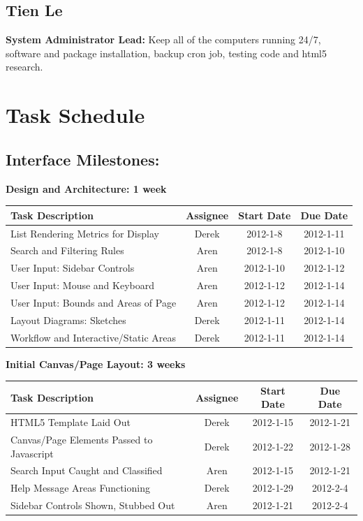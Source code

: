 \documentclass[12pt, letterpaper]{article}
\begin{document}
  \subsection{Tien Le}
  {\bf System Administrator Lead:} Keep all of the computers running 24/7, software and package installation, backup cron job, testing code and html5 research. 

\section{Task Schedule}
	\subsection{Interface Milestones:}

  \begin{center}
		{\bf Design and Architecture: 1 week}
    \begin{tabular}{| p{8.3cm} || c | c | c | }
      \hline
      Task Description & Assignee & Start Date & Due Date \\
      \hline
	    List Rendering Metrics for Display & Derek & 2012-1-8 & 2012-1-11 \\
	    Search and Filtering Rules & Aren & 2012-1-8 & 2012-1-10 \\
	    User Input: Sidebar Controls & Aren & 2012-1-10 & 2012-1-12 \\
			User Input: Mouse and Keyboard & Aren & 2012-1-12 & 2012-1-14 \\
	    User Input: Bounds and Areas of Page & Aren & 2012-1-12 & 2012-1-14 \\
	    Layout Diagrams: Sketches & Derek & 2012-1-11 & 2012-1-14 \\
	    Workflow and Interactive/Static Areas & Derek & 2012-1-11 & 2012-1-14 \\
      \hline
    \end{tabular}
  \end{center}

  \begin{center}
		{\bf Initial Canvas/Page Layout: 3 weeks}
    \begin{tabular}{| p{8.3cm} || c | c | c | }
      \hline
      Task Description & Assignee & Start Date & Due Date \\
      \hline
	    HTML5 Template Laid Out & Derek & 2012-1-15 & 2012-1-21 \\
	    Canvas/Page Elements Passed to Javascript & Derek & 2012-1-22 & 2012-1-28 \\
	    Search Input Caught and Classified & Aren & 2012-1-15 & 2012-1-21 \\
	    Help Message Areas Functioning & Derek & 2012-1-29 & 2012-2-4 \\
	    Sidebar Controls Shown, Stubbed Out & Aren & 2012-1-21 & 2012-2-4 \\
      \hline
    \end{tabular}
  \end{center}
\end{document}
